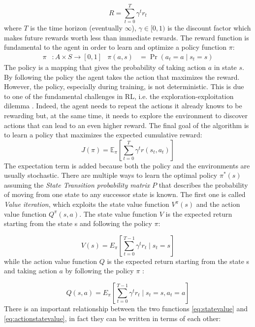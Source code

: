 \begin{equation}
  \label{eq:totalreward}
  R=\sum _{t=0}^{T}\gamma ^{t}r_{t}
\end{equation}
where $T$ is the time horizon (eventually $\infty$), $\gamma \in [0,1)$ is the discount factor which makes future rewards worth less than immediate rewards. The reward function is fundamental to the agent in order to learn and optimize a policy function $\pi$:
\begin{align}
  \displaystyle \pi &:A\times S\rightarrow [0,1] &  \displaystyle \pi (a,s)&=\Pr(a_{t}=a\mid s_{t}=s) \label{eq:label1}
\end{align}
The policy is a mapping that gives the probability of taking action $a$ in state $s$. By following the policy the agent takes the action that maximizes the reward. However, the policy, especially during training, is not deterministic. This is due to one of the fundamental challenges in RL, i.e. the exploration-exploitation dilemma \citep{Sutton1998}. Indeed, the agent needs to repeat the actions it already knows to be rewarding but, at the same time, it needs to explore the environment to discover actions that can lead to an even higher reward. 
The final goal of the algorithm is to learn a policy that maximizes the expected cumulative reward:
\begin{equation}
  \label{eq:rlobj}
  J(\pi)=\mathbb{E}_{\pi}[\sum _{t=0}^{T}\gamma ^{t}r(s_{t},a_{t})]
\end{equation}
The expectation term is added because both the policy and the environments are usually stochastic.
There are multiple ways to learn the optimal policy $\pi^{*}(s)$ assuming the \textit{State Transition probability matrix} $P$ that describes the probability of moving from one state to any successor state is known. The first one is called \textit{Value iteration}, which exploits the state value function $V^{\pi}(s)$ and the action value function $Q^{\pi}(s, a)$. The state value function $V$ is the expected return starting from the state s and following the policy $\pi$:

\begin{equation}
  \label{eq:statevalue}
  V(s) = E_{\pi}[\sum_{t=0}^{T-1} \gamma^t r_t \mid s_t=s]
\end{equation}
while the action value function $Q$ is the expected return starting from the state s and taking action $a$ by following the policy $\pi$ :

\begin{equation}
  \label{eq:actionstatevalue}
  Q(s,a) = E_{\pi}[\sum_{t=0}^{T-1} \gamma^t r_t \mid s_t=s, a_t = a]
\end{equation}
There is an important relationship between the two functions \ref{eq:statevalue} and \ref{eq:actionstatevalue}, in fact they can be written in terms of each other:


